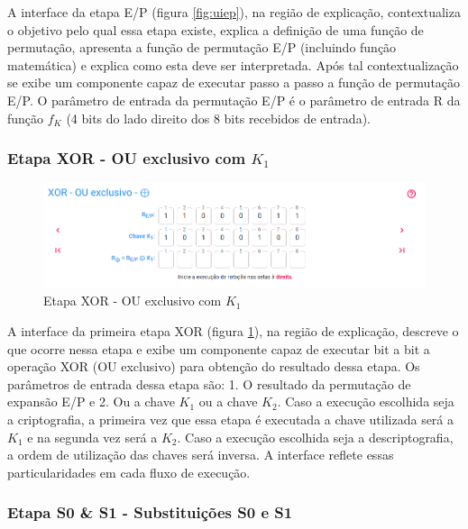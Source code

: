 A interface da etapa E/P (figura \ref{fig:uiep}), na região de explicação, contextualiza o objetivo pelo qual essa etapa existe, explica a definição de uma função de permutação, apresenta a função de permutação E/P (incluindo função matemática) e explica como esta deve ser interpretada. Após tal contextualização se exibe um componente capaz de executar passo a passo a função de permutação E/P. O parâmetro de entrada da permutação E/P é o parâmetro de entrada R da função \(f_K\) (4 bits do lado direito dos 8 bits recebidos de entrada).

\subsubsection{Etapa XOR - OU exclusivo com \(K_1\)}

\begin{figure}[H]
    \centering
    \caption{Etapa XOR - OU exclusivo com \(K_1\)}
    \label{fig:uixork1}
    \includegraphics[width=1\linewidth]{UI/UIXORK1.png}
\end{figure}

A interface da primeira etapa XOR (figura \ref{fig:uixork1}), na região de explicação, descreve o que ocorre nessa etapa e exibe um componente capaz de executar bit a bit a operação XOR (OU exclusivo) para obtenção do resultado dessa etapa. Os parâmetros de entrada dessa etapa são: 1. O resultado da permutação de expansão E/P e 2. Ou a chave \(K_1\) ou a chave \(K_2\). Caso a execução escolhida seja a criptografia, a primeira vez que essa etapa é executada a chave utilizada será a \(K_1\) e na segunda vez será a \(K_2\). Caso a execução escolhida seja a descriptografia, a ordem de utilização das chaves será inversa. A interface reflete essas particularidades em cada fluxo de execução.

\subsubsection{Etapa S0 \& S1 - Substituições S0 e S1}

